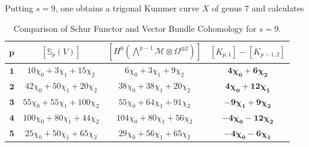 \documentclass[10pt]{amsart}
\theoremstyle{definition}
\begin{document}
Putting $s=9$, one obtains a trigonal Kummer curve $X$ of genus $7$ and calculates
\begin{table}[h]
\centering
\renewcommand{\arraystretch}{1.5}
\begin{tabular}{|c|c|c|c|}
\hline
$\mathbf{p}$ & $[\mathbb{S}_p(V)]$ & $[H^0(\bigwedge^{p-1}\mathcal{M}\otimes\Omega^{\otimes 2})]$ & $[K_{p,1}] - [K_{p-1,2}]$ \\ \hline
$\mathbf{1}$ 
& $10\chi_0 + 3\chi_1 + 15\chi_2$ 
& $6\chi_0 + 3\chi_1 + 9\chi_2$ 
& $\mathbf{4\chi_0 + 6\chi_2}$ \\ \hline
$\mathbf{2}$ 
& $42\chi_0 + 50\chi_1 + 20\chi_2$ 
& $38\chi_0 + 38\chi_1 + 20\chi_2$ 
& $\mathbf{4\chi_0 + 12\chi_1}$ \\ \hline
$\mathbf{3}$ 
& $55\chi_0 + 55\chi_1 + 100\chi_2$ 
& $55\chi_0 + 64\chi_1 + 91\chi_2$ 
& $\mathbf{-9\chi_1 + 9\chi_2}$ \\ \hline
$\mathbf{4}$ 
& $100\chi_0 + 80\chi_1 + 44\chi_2$ 
& $104\chi_0 + 80\chi_1 + 56\chi_2$ 
& $\mathbf{-4\chi_0 - 12\chi_2}$ \\ \hline
$\mathbf{5}$ 
& $25\chi_0 + 50\chi_1 + 65\chi_2$ 
& $29\chi_0 + 56\chi_1 + 65\chi_2$ 
& $\mathbf{-4\chi_0 - 6\chi_1}$ \\ \hline
\end{tabular}
\caption{Comparison of Schur Functor and Vector Bundle Cohomology for $s=9$.}\label{tab:s=9}
\end{table}
\end{document}
